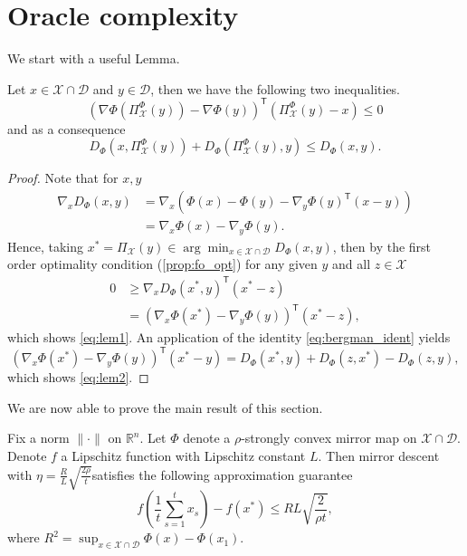 \section{Oracle complexity}
\label{subsec:complexity}
We start with a useful Lemma.
\begin{lemma}
Let $x \in \mathcal{X}\cap \mathcal{D}$ and $y\in \mathcal{D}$, then we have the following two inequalities.
\begin{equation}\label{eq:lem1}
	\left(\nabla\Phi\left(\Pi_\mathcal{X}^\Phi(y) \right)- \nabla \Phi(y)\right)^\mathsf{T}\left(\Pi_\mathcal{X}^\Phi(y) - x \right) \leq 0
\end{equation}
and as a consequence
\begin{equation}\label{eq:lem2}
	D_\Phi(x, \Pi_\mathcal{X}^\Phi(y)) + D_\Phi(\Pi_\mathcal{X}^\Phi(y), y) \leq D_\Phi(x, y).
\end{equation}
\end{lemma}
\begin{proof}
Note that for $x, y$
\begin{align*}
	\nabla_x D_\Phi(x, y) &= \nabla_x \left(\Phi(x) - \Phi(y) - \nabla_y\Phi(y)^\mathsf{T}(x - y) \right)	\\
	&=	\nabla_x \Phi(x) - \nabla_y \Phi(y).
\end{align*}
Hence, taking $x^* = \Pi_\mathcal{X}(y) \in \arg \min_{x\in \mathcal{X}\cap\mathcal{D}} D_\Phi(x, y) $, then by the first order optimality condition (\autoref{prop:fo_opt}) for any given $y$ and all $z \in \mathcal{X}$
\begin{align*}
	0 & \geq \nabla_x D_\Phi(x^*, y)^\mathsf{T}(x^* - z) \\
	  & = \left(\nabla_x \Phi(x^*) - \nabla_y \Phi(y)\right)^\mathsf{T} (x^* - z),
\end{align*}
which shows \eqref{eq:lem1}. An application of the identity \eqref{eq:bergman_ident} yields
\begin{equation*}
	\left(\nabla_x \Phi(x^*) - \nabla_y \Phi(y)\right)^\mathsf{T} (x^* - y) = D_\Phi(x^*, y) + D_\Phi(z, x^*) - D_\Phi(z, y),
\end{equation*}
which shows \eqref{eq:lem2}.
\end{proof}

We are now able to prove the main result of this section.
\begin{theorem}\label{compl:mirror_descent}
Fix a norm $\|\cdot \|$ on $\mathbb{R}^n$. Let $\Phi$ denote a $\rho$-strongly convex mirror map on $\mathcal{X}\cap\mathcal{D}$. Denote $f$ a Lipschitz function with Lipschitz constant $L$. Then mirror descent with $\eta =\frac{R}{L}\sqrt{\frac{2\rho}{t}}$satisfies the following approximation guarantee
\begin{equation*}
	f\left(\frac{1}{t}\sum_{s=1}^t x_s \right) - f(x^*) \leq RL\sqrt{\frac{2}{\rho t}},
\end{equation*}
where $R^2 = \sup_{x\in \mathcal{X}\cap\mathcal{D}}\Phi(x)-\Phi(x_1)$.
\end{theorem}

